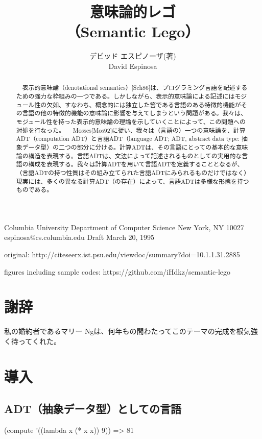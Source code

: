 \documentclass[11pt, oneside]{jsarticle}   	%
\title{意味論的レゴ\\
（Semantic Lego）
}
\author{デビッド エスピノーザ(著)\\
David Espinosa
}
\begin{document}
\maketitle


Columbia University
Department of Computer Science
New York, NY 10027
espinosa@cs.columbia.edu
Draft March 20, 1995

original: http://citeseerx.ist.psu.edu/viewdoc/summary?doi=10.1.1.31.2885

figures including sample codes: https://github.com/iHdkz/semantic-lego

\begin{abstract}
　表示的意味論（denotational semantics）[Sch86]は、プログラミング言語を記述するための強力な枠組みの一つである。しかしながら、表示的意味論による記述にはモジュール性の欠如、すなわち、概念的には独立した筈である言語のある特徴的機能がその言語の他の特徴的機能の意味論に影響を与えてしまうという問題がある。我々は、モジュール性を持った表示的意味論の理論を示していくことによって、この問題への対処を行なった。
　Mosses[Mos92]に従い、我々は（言語の）一つの意味論を、計算ADT（computation ADT）と言語ADT（language ADT; ADT, abstract data type: 抽象データ型）の二つの部分に分ける。計算ADTは、その言語にとっての基本的な意味論の構造を表現する。言語ADTは、文法によって記述されるものとしての実用的な言語の構成を表現する。我々は計算ADTを用いて言語ADTを定義することとなるが、（言語ADTの持つ性質はその組み立てられた言語ADTにみられるものだけではなく）現実には、多くの異なる計算ADT（の存在）によって、言語ADTは多様な形態を持つものである。
\end{abstract}
\tableofcontents

\section*{謝辞}
私の婚約者であるマリー Ngは、何年もの間わたってこのテーマの完成を根気強く待ってくれた。


\section{導入}
\subsection{ ADT（抽象データ型）としての言語}
(compute '((lambda x (* x x)) 9))
=> 81
\end{document}
